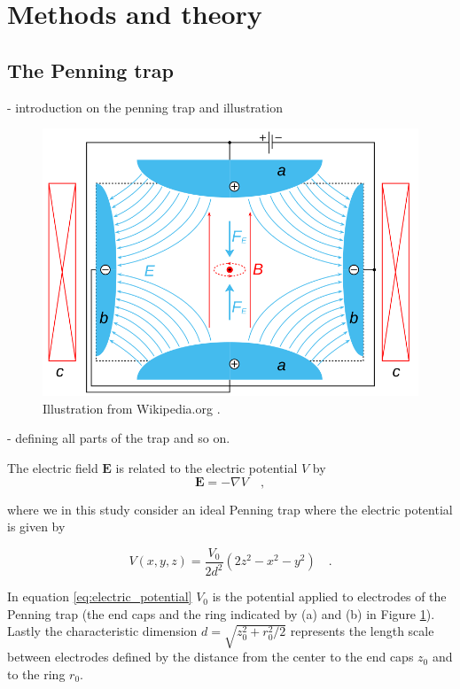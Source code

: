 \documentclass[../main_proj3.tex]{subfiles}
\begin{document}
\section{Methods and theory}\label{sec:methods_and_theory}

\subsection{The Penning trap}

- introduction on the penning trap and illustration
\begin{figure}[h!]
    \centering
    \includegraphics[width=0.9\linewidth]{Project 3/figures/Penning_Trap.png}
    \caption{Illustration from Wikipedia.org \cite{PenningTrapIllustration}.}
    \label{fig:Penning_trap}
\end{figure}

- defining all parts of the trap and so on.


The electric field $\mathbf{E}$ is related to the electric potential $V$ by 
\begin{equation}
\label{eq:electric_field-electric_potential}
\mathbf{E} = - \nabla V \quad, 
\end{equation}

where we in this study consider an ideal Penning trap where the electric potential is given by 

\begin{equation}
\label{eq:electric_potential}
V(x,y,z) = \frac{V_0}{2d^{2}} (2z^{2} - x^{2} - y^{2}) \quad.
\end{equation}

In equation \eqref{eq:electric_potential} $V_0$ is the potential applied to electrodes of the Penning trap (the end caps and the ring indicated by (a) and (b) in Figure \ref{fig:Penning_trap}). Lastly the characteristic dimension $d=\sqrt{z_0^{2}+r_0^{2}/2}$ represents the length scale between electrodes defined by the distance from the center to the end caps $z_0$ and to the ring $r_0$. 
\end{document}
